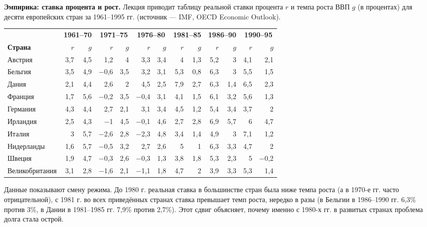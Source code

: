 \documentclass[11pt,a4paper]{article}
\begin{document}
\textbf{Эмпирика: ставка процента и рост.} Лекция приводит таблицу реальной ставки процента $r$ и темпа роста ВВП $g$ (в процентах) для десяти европейских стран за 1961--1995 гг. (источник --- IMF, OECD Economic Outlook).

\begin{center}
\scriptsize
\setlength{\tabcolsep}{2.2pt}
\begin{tabular}{l|rr|rr|rr|rr|rr|rr}
\toprule
 & \multicolumn{2}{c|}{\textbf{1961--70}} & \multicolumn{2}{c|}{\textbf{1971--75}} & \multicolumn{2}{c|}{\textbf{1976--80}} & \multicolumn{2}{c|}{\textbf{1981--85}} & \multicolumn{2}{c|}{\textbf{1986--90}} & \multicolumn{2}{c}{\textbf{1990--95}}\\
\textbf{Страна} & $r$ & $g$ & $r$ & $g$ & $r$ & $g$ & $r$ & $g$ & $r$ & $g$ & $r$ & $g$\\
\midrule
Австрия & 3,7 & 4,5 & 1,2 & 4 & 3,3 & 3,4 & 4 & 1,3 & 5,2 & 3 & 4,1 & 2,1\\
Бельгия & 3,5 & 4,9 & −0,6 & 3,5 & 3,2 & 3,1 & 5,3 & 0,8 & 6,3 & 3 & 5,5 & 1,5\\
Дания & 2,1 & 4,4 & 2,6 & 2 & 4,5 & 2,5 & 7,9 & 2,7 & 6,3 & 1,4 & 6,5 & 2,3\\
Франция & 1,7 & 5,6 & −0,2 & 3,5 & −0,4 & 3,1 & 4,1 & 1,5 & 6,1 & 3,2 & 5,6 & 1,3\\
Германия & 4,3 & 4,4 & 2,7 & 2,1 & 3,1 & 3,4 & 4,5 & 1,2 & 5,4 & 3,4 & 3,7 & 2\\
Ирландия & 2,5 & 4,3 & −1 & 4,5 & −0,1 & 4,6 & 2,7 & 2,8 & 6,9 & 5,7 & 6 & 4,7\\
Италия & 3 & 5,7 & −2,6 & 2,8 & −2,3 & 4,8 & 3,4 & 1,4 & 4,9 & 3 & 7,1 & 1,2\\
Нидерланды & 1,6 & 5,7 & −0,5 & 3,2 & 2,7 & 2,6 & 5 & 1 & 6,3 & 3,3 & 4,7 & 2\\
Швеция & 1,9 & 4,7 & −0,3 & 2,6 & −0,3 & 1,3 & 3,8 & 1,8 & 5,3 & 2,3 & 5 & −0,2\\
Великобритания & 3,1 & 2,8 & −1,6 & 2,1 & −1,1 & 1,8 & 4,7 & 2 & 3,9 & 3,3 & 5,3 & 1,4\\
\bottomrule
\end{tabular}
\end{center}

Данные показывают смену режима. До 1980 г. реальная ставка в большинстве стран была ниже темпа роста (а в 1970-е гг. часто отрицательной), с 1981 г. во всех приведённых странах ставка превышает темп роста, нередко в разы (в Бельгии в 1986--1990 гг. 6,3\% против 3\%, в Дании в 1981--1985 гг. 7,9\% против 2,7\%). Этот сдвиг объясняет, почему именно с 1980-х гг. в развитых странах проблема долга стала острой.
\end{document}
